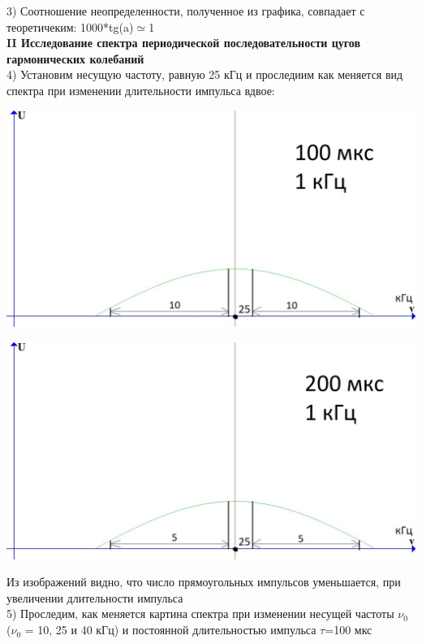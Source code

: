 \documentclass[a4paper,12pt]{article} %
\begin{document}
3) Соотношение неопределенности, полученное из графика, совпадает с теоретичеким: 1000*tg(a)$\simeq$1\\
\textbf{II Исследование спектра периодической последовательности
цугов гармонических колебаний}\\
  4) Установим несущую частоту, равную 25 кГц и проследиим как меняется вид спектра при изменении длительности импульса вдвое:
\begin{flushleft}
\begin{center}

\includegraphics[scale=0.47]{1001} 
\end{center}

\includegraphics[scale=0.55]{2001} \\

\end{flushleft}

Из изображений видно, что число прямоугольных импульсов уменьшается, при увеличении длительности импульса\\
5) Проследим, как меняется картина
спектра при изменении несущей частоты $\nu_0$ ($\nu_0$ = 10, 25 и 40 кГц) и постоянной длительностью импульса $\tau$=100 мкс \\
\end{document}

